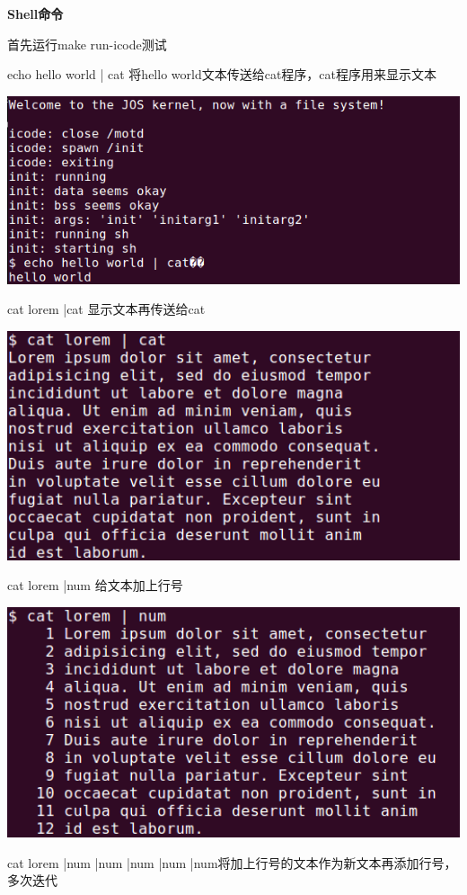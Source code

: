 \begin{ExerciseList}
  \textbf{Shell命令}

  首先运行make run-icode测试

  echo hello world | cat 将hello world文本传送给cat程序，cat程序用来显示文本

  \includegraphics[width=6in]{figures/lab5/image98.png}

  cat lorem |cat 显示文本再传送给cat

  \includegraphics[width=6in]{figures/lab5/image99.png}

  cat lorem |num 给文本加上行号

  \includegraphics[width=6in]{figures/lab5/image100.png}

  cat lorem |num |num |num |num |num将加上行号的文本作为新文本再添加行号，多次迭代


\end{ExerciseList}

